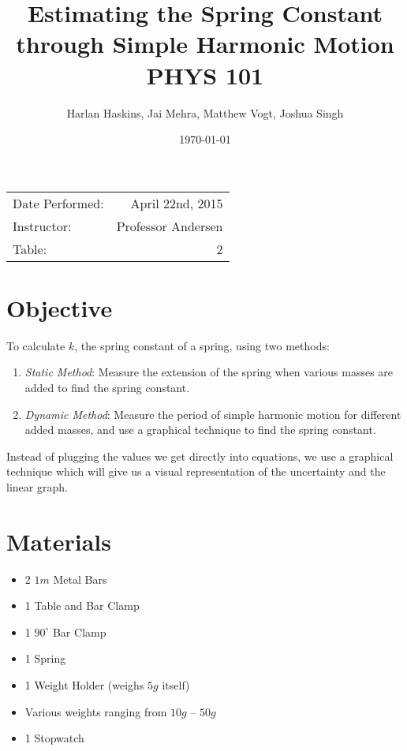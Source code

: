 \documentclass{article}
\title{Estimating the Spring Constant \\ through Simple Harmonic Motion \\ PHYS 101}
\author{Harlan Haskins, Jai Mehra, Matthew Vogt, Joshua Singh}
\date{\today}
\begin{document}
\maketitle

\begin{center}
\begin{tabular}{l r}
Date Performed: & April 22nd, 2015 \\
Instructor: & Professor Andersen \\
Table: & 2
\end{tabular}
\end{center}

\pagebreak

\section{Objective}

To calculate $k$, the spring constant of a spring, using two methods:
\begin{enumerate}
	\item \emph{Static Method}: Measure the extension of the spring when various masses are added to find the spring constant.
	\item \emph{Dynamic Method}: Measure the period of simple harmonic motion for different added masses, and use a graphical technique to find the spring constant.
\end{enumerate}
Instead of plugging the values we get directly into equations, we use a graphical technique which will give us a visual representation of the uncertainty and the linear graph.
\begin{center}\end{center}

\section{Materials}
\begin{itemize}
	\item 2 $1m$ Metal Bars
	\item 1 Table and Bar Clamp
	\item 1 $90^{\circ}$ Bar Clamp
	\item 1 Spring
	\item 1 Weight Holder (weighs $5g$ itself)
	\item Various weights ranging from $10g$ – $50g$
	\item 1 Stopwatch
\end{itemize}
\end{document}
